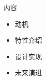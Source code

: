 \begin{frame}
  \titlepage
\end{frame}

\begin{frame}{内容}
    \begin{itemize}
    \item \alert{动机}
    \item \alert{特性介绍}
    \item \alert{设计实现}
    \item \alert{未来演进}    
    \end{itemize}
\end{frame}